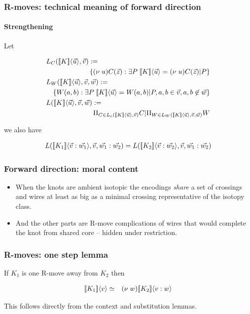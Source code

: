 \documentclass{beamer}
\begin{document}
 \begin{frame}
   \frametitle{R-moves: technical meaning of forward direction}
   \framesubtitle{Strengthening} 

   Let
  
   \begin{eqnarray}
     \lefteqn{L_C(\meaningof{K}\langle \vec{u} \rangle, \vec{v}) :=} \nonumber \\
     & & \{ (\nu \; u)C(\vec{z}) : \exists P \; \meaningof{K}\langle \vec{u} \rangle = (\nu \; u)C(\vec{z}) | P \} \nonumber \\
     \lefteqn{L_W(\meaningof{K}\langle \vec{u} \rangle, \vec{v}, \vec{w}) :=} \nonumber \\
     & & \{ W(a,b) : \exists P \; \meaningof{K}\langle \vec{u} \rangle = W(a,b) | P, a,b \in \vec{v}, a, b \not\in \vec{w} \} \nonumber \\
     \lefteqn{L(\meaningof{K}\langle \vec{u} \rangle, \vec{v}, \vec{w}) :=} \nonumber \\
     & & \Pi_{C \in L_{c}(\meaningof{K}\langle \vec{u} \rangle, \vec{v})}C | \Pi_{W \in L_{W}(\meaningof{K}\langle \vec{u} \rangle, \vec{v}, \vec{w})} W \nonumber
   \end{eqnarray}

   we also have

   \begin{eqnarray}
     L([\![ K_{1} ]\!]\langle \vec{v}:\vec{w_1} \rangle,\vec{v},\vec{w_1}:\vec{w_2}) = L([\![ K_{2} ]\!]\langle \vec{v}:\vec{w_2} \rangle,\vec{v},\vec{w_1}:\vec{w_2}) \nonumber
   \end{eqnarray}

 \end{frame}

\begin{frame}
  \frametitle{Forward direction: moral content} 

  \begin{itemize}
  \item When the knots are ambient isotopic the encodings
    \textit{share} a set of crossings and wires at least as big as a
    minimal crossing representative of the isotopy class.
  \item And the other parts are R-move complications of wires that
    would complete the knot from shared core -- hidden under restriction.
  \end{itemize}

\end{frame}

\begin{frame}
  \frametitle{R-moves: one step lemma}
  If $K_{1}$ is one R-move away from $K_{2}$ then 

  \begin{eqnarray}
    [\![ K_{1} ]\!]\langle v \rangle & \simeq & (\nu \; w)[\![ K_{2} ]\!]\langle v:w \rangle \nonumber
  \end{eqnarray}

  This follows directly from the context and substitution lemmas.
\end{frame}
\end{document}
